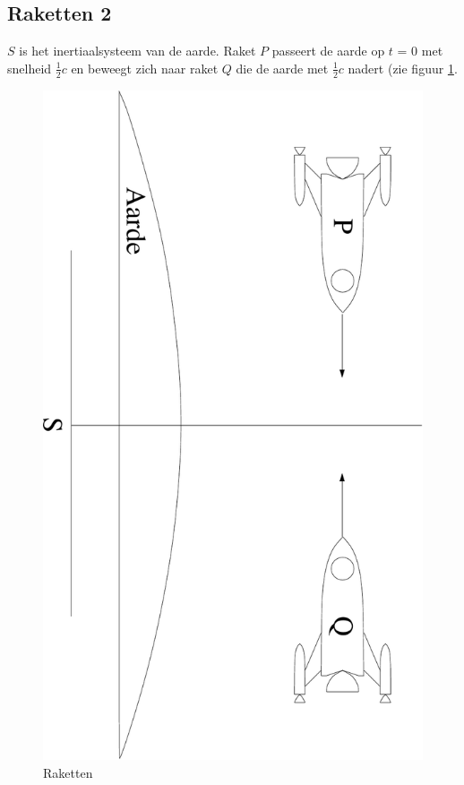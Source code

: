 \subsection{Raketten 2}\label{prob:rak4}
$S$ is het inertiaalsysteem van de aarde. 
Raket $P$ passeert de aarde op $t$ = 0 met snelheid $\frac{1}{2}c$ en 
beweegt zich naar raket $Q$ die de aarde met $\frac{1}{2}c$ nadert (zie
figuur \ref{f:raket}. 


\begin{figure}[ht]
\centering
\includegraphics[width=.5\textwidth]{oefeningen.pictures/rockets}
\caption{Raketten}
\label{f:raket}
\end{figure}



